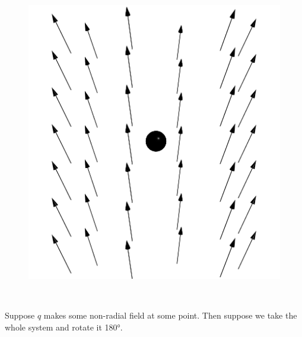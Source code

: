 \documentclass{article}
\begin{document}
\begin{minipage}{0.3\textwidth}
\begin{figure}[H]
\centering
\includegraphics[width=\textwidth]{figures/2l2.png}
\end{figure}
\end{minipage}
~
\begin{minipage}{0.6\textwidth}
    Suppose $q$ makes some non-radial field at some point. Then suppose we take the whole system and rotate it \ang{180}.
\end{minipage}

\vspace{1em}
\end{document}
